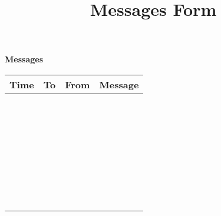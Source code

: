 \documentclass[ 12pt]{article}
\newcommand{\subHead}[1]{ \multirow{4}{*}{\rotatebox{90}{\scriptsize {#1}}} }
\begin{document}
\title{ Messages Form }
\author{}
\date{}
\mdseries
\sffamily
\hoffset=-1.2in
\textwidth=8.0in
\textheight=9in
\footskip=0pt
\begin{center}
{ \large \bf \sffamily
Messages
} 
\end{center}
%
\begin{tabular}{ 
|| p{1cm}
|| p{2.5cm}
|| p{2.5cm}
|| p{12cm}||
}
\hline
\multicolumn{1}{||c||}{\multirow{1}{*}{Time}} &
\multicolumn{1}{c||}{\multirow{1}{*}{To}} &
\multicolumn{1}{c||}{\multirow{1}{*}{From}} &
\multicolumn{1}{c||}{\multirow{1}{*}{Message}} 
\\ \hline
\hline &&& \\
\hline &&& \\
\hline &&& \\
\hline &&& \\
\hline &&& \\
\hline &&& \\
\hline &&& \\
\hline &&& \\ 
\hline &&& \\
\hline &&& \\
\hline &&& \\
\hline &&& \\
\hline &&& \\
\hline &&& \\
\hline &&& \\
\hline &&& \\
\hline &&& \\
\hline &&& \\
\hline &&& \\
\hline &&& \\
\hline &&& \\
\hline &&& \\
\hline &&& \\
\hline &&& \\
\hline &&& \\
\hline &&& \\
\hline &&& \\
\hline &&& \\
\hline &&& \\
\hline &&& \\
\hline &&& \\
\hline &&& \\
\hline &&& \\
\hline 
\end{tabular}
\end{document}
